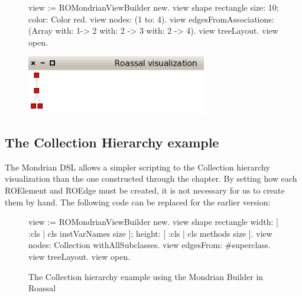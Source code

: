 \documentclass[a4paper,10pt,twoside]{book}
\begin{document}
\begin{figure}[H]
      \begin{minipage}[t]{1\textwidth}
      \vspace{0pt}
\begin{code}{}
view := ROMondrianViewBuilder new.
view shape rectangle 
	size: 10;
	color: Color red.
view nodes: (1 to: 4).
view edgesFromAssociations: (Array with: 1-> 2 with: 2 -> 3 with: 2 -> 4).
view treeLayout.
view open.
\end{code}
   \end{minipage}
   \hfill
   \begin{minipage}[t]{1\textwidth}
	 \vspace{0pt} \raggedright
       \centering
		\includegraphics[width=0.7\textwidth]{mondrian6}
   \end{minipage}
\label{fig:mondrian6}
\end{figure} 




\subsection*{The Collection Hierarchy example}

The Mondrian DSL allows a simpler scripting to the Collection hierarchy visualization than the one constructed through the chapter.
By setting how each ROElement and ROEdge must be created, it is not necessary for us to create them by hand.
The following code can be replaced for the earlier version:


\begin{figure}[H]

\begin{code}{}
view := ROMondrianViewBuilder new.
view shape rectangle
	width: [ :cls | cls instVarNames size ]; 
	height: [ :cls | cls methods size ].
view nodes: Collection withAllSubclasses.
view edgesFrom: #superclass.
view treeLayout.
view open.
\end{code}
\label{fig:mondrian}
\caption{The Collection hierarchy example using the Mondrian Builder in Roassal}
\end{figure}

\end{document}
